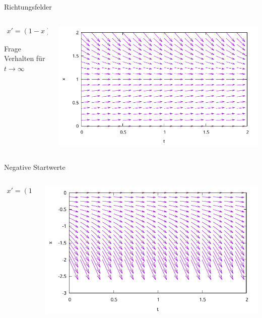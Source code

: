\begin{frame}{Richtungsfelder}
  \begin{columns}
    \begin{column}[t]{.2\textwidth}
    \begin{gather*}
      x'= (1-x) x
    \end{gather*}
    \begin{exampleblock}{Frage}
      Verhalten für $t\to\infty$
    \end{exampleblock}
    \end{column}
    \begin{column}[t]{.8\textwidth}
      \mbox{}
      
      \includegraphics[width=\textwidth]{gnuplot/logistic.pdf}
    \end{column}
  \end{columns}
\end{frame}

\begin{frame}{Negative Startwerte}
  \begin{columns}
    \begin{column}[t]{.2\textwidth}
    \begin{gather*}
      x'= (1-x) x
    \end{gather*}      
    \end{column}
    \begin{column}[t]{.8\textwidth}
      \mbox{}
      
      \includegraphics[width=\textwidth]{gnuplot/logisticm.pdf}
    \end{column}
  \end{columns}
\end{frame}


